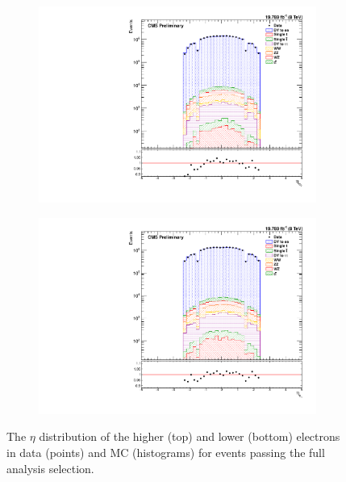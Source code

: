 \begin{figure}[!htbp]
    \vspace*{\fill}
    \centering
    \begin{subfigure}[b]{0.65\textwidth}
        \includegraphics[width=\textwidth]{figures/e0_eta.pdf}
        \caption{}
        \label{fig:e_eta_high}
    \end{subfigure}
    \begin{subfigure}[b]{0.65\textwidth}
        \includegraphics[width=\textwidth]{figures/e1_eta.pdf}
        \caption{}
        \label{fig:e_eta_low}
    \end{subfigure}
    \caption{
        The $\eta$ distribution of the higher (top) and lower (bottom) \pt
        electrons in data (points) and MC (histograms) for events passing the
        full analysis selection.
    }
    \label{fig:e_eta}
\end{figure}

